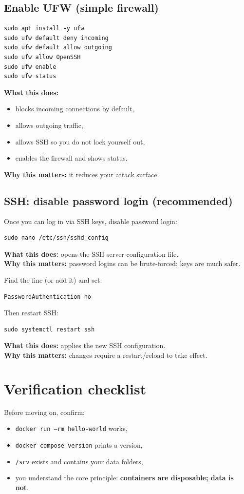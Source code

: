 \subsection{Enable UFW (simple firewall)}
\begin{lstlisting}
sudo apt install -y ufw
sudo ufw default deny incoming
sudo ufw default allow outgoing
sudo ufw allow OpenSSH
sudo ufw enable
sudo ufw status
\end{lstlisting}

\textbf{What this does:}
\begin{itemize}[leftmargin=*]
  \item blocks incoming connections by default,
  \item allows outgoing traffic,
  \item allows SSH so you do not lock yourself out,
  \item enables the firewall and shows status.
\end{itemize}

\textbf{Why this matters:} it reduces your attack surface.

\subsection{SSH: disable password login (recommended)}
Once you can log in via SSH keys, disable password login:

\begin{lstlisting}
sudo nano /etc/ssh/sshd_config
\end{lstlisting}

\textbf{What this does:} opens the SSH server configuration file. \\
\textbf{Why this matters:} password logins can be brute-forced; keys are much safer.

Find the line (or add it) and set:

\begin{lstlisting}
PasswordAuthentication no
\end{lstlisting}

Then restart SSH:

\begin{lstlisting}
sudo systemctl restart ssh
\end{lstlisting}

\textbf{What this does:} applies the new SSH configuration. \\
\textbf{Why this matters:} changes require a restart/reload to take effect.

\section{Verification checklist}
Before moving on, confirm:
\begin{itemize}[leftmargin=*]
  \item \texttt{docker run --rm hello-world} works,
  \item \texttt{docker compose version} prints a version,
  \item \texttt{/srv} exists and contains your data folders,
  \item you understand the core principle: \textbf{containers are disposable; data is not}.
\end{itemize}

